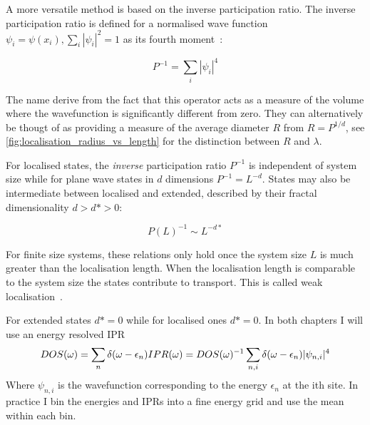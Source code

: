 A more versatile method is based on the inverse participation ratio. The inverse participation ratio is defined for a normalised wave function \(\psi_i = \psi(x_i), \sum_i |\psi_i|^2 = 1\) as its fourth moment~\autocite{kramerLocalizationTheoryExperiment1993}:

\[
P^{-1} = \sum_i |\psi_i|^4
\]

The name derive from the fact that this operator acts as a measure of the volume where the wavefunction is significantly different from zero. They can alternatively be thougt of as providing a measure of the average diameter \(R\) from \(R = P^{1/d}\), see \cref{fig:localisation_radius_vs_length} for the distinction between \(R\) and \(\lambda\).

For localised states, the \emph{inverse} participation ratio \(P^{-1}\) is independent of system size while for plane wave states in \(d\) dimensions \(P^{-1} = L^{-d}\). States may also be intermediate between localised and extended, described by their fractal dimensionality \(d > d* > 0\):

\[
P(L)^{-1} \sim L^{-d*} 
\]

For finite size systems, these relations only hold once the system size \(L\) is much greater than the localisation length. When the localisation length is comparable to the system size the states contribute to transport. This is called weak localisation~\autocite{altshulerMagnetoresistanceHallEffect1980,dattaElectronicTransportMesoscopic1995}.

For extended states \(d* = 0\) while for localised ones \(d* = 0\). In both chapters I will use an energy resolved IPR \[
DOS(\omega) = \sum_n \delta(\omega - \epsilon_n)\\
IPR(\omega) = DOS(\omega)^{-1} \sum_{n,i} \delta(\omega - \epsilon_n) |\psi_{n,i}|^4
\] Where \(\psi_{n,i}\) is the wavefunction corresponding to the energy \(\epsilon_n\) at the ith site. In practice I bin the energies and IPRs into a fine energy grid and use the mean within each bin.
